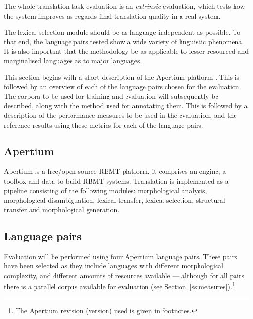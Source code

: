 \documentclass[11pt]{article}
\begin{document}
The
whole translation task evaluation is an \emph{extrinsic} evaluation, which
tests how the system improves as regards final translation
quality in a real system.

The lexical-selection module should be as language-independent as
possible. To that end, the language pairs tested show a wide
variety of linguistic phenomena. It is also important that the
methodology be as applicable to lesser-resourced and marginalised
languages as to major languages.

This section begins with a short description of the Apertium 
platform \citep{forcada2011apertium}. This is followed by 
an overview of each of the language
pairs chosen for the evaluation. The corpora to be used for training
and evaluation will subsequently be described, along with the method
used for annotating them. This is followed by a description of the
performance measures to be used in the evaluation, and the reference
results using these metrics for each of the language pairs.

\subsection{Apertium}
\label{sec:apertium}

Apertium is a free/open-source RBMT platform, it comprises an engine,
a toolbox and data to build RBMT systems. Translation is implemented
as a pipeline consisting of the following modules: morphological
analysis, morphological disambiguation, lexical transfer, lexical
selection, structural transfer and morphological generation. 

\subsection{Language pairs}
\label{sec:eval-systems}

Evaluation will be performed using four Apertium \citep{forcada2011apertium} language pairs. These pairs
have been selected as they include languages with different
morphological complexity, and different amounts of resources available
--- although for all pairs there is a parallel corpus available
for evaluation (see Section~\ref{ss:measures}).\footnote{The Apertium revision (version) used is given in footnotes.}
\end{document}
